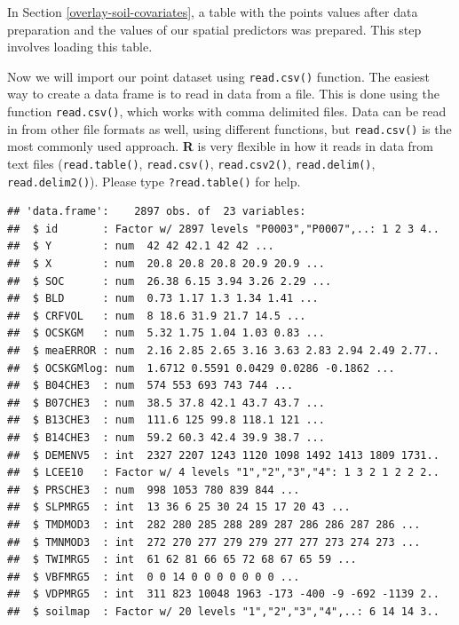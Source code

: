 \documentclass[10pt,b5paper,]{book}
\newenvironment{Shaded}{\begin{snugshade}}{\end{snugshade}}
\newcommand{\CommentTok}[1]{\textcolor[rgb]{0.56,0.35,0.01}{\textit{#1}}}
\newcommand{\KeywordTok}[1]{\textcolor[rgb]{0.13,0.29,0.53}{\textbf{#1}}}
\newcommand{\NormalTok}[1]{#1}
\newcommand{\OperatorTok}[1]{\textcolor[rgb]{0.81,0.36,0.00}{\textbf{#1}}}
\newcommand{\StringTok}[1]{\textcolor[rgb]{0.31,0.60,0.02}{#1}}
\theoremstyle{definition}
\theoremstyle{definition}
\theoremstyle{definition}
\theoremstyle{remark}
\begin{document}
In Section \ref{overlay-soil-covariates}, a table with the points values
after data preparation and the values of our spatial predictors was
prepared. This step involves loading this table.

Now we will import our point dataset using \texttt{read.csv()} function.
The easiest way to create a data frame is to read in data from a file.
This is done using the function \texttt{read.csv()}, which works with
comma delimited files. Data can be read in from other file formats as
well, using different functions, but \texttt{read.csv()} is the most
commonly used approach. \textbf{R} is very flexible in how it reads in
data from text files (\texttt{read.table()}, \texttt{read.csv()},
\texttt{read.csv2()}, \texttt{read.delim()}, \texttt{read.delim2()}).
Please type \texttt{?read.table()} for help.

\begin{Shaded}
\end{Shaded}

\begin{verbatim}
## 'data.frame':    2897 obs. of  23 variables:
##  $ id       : Factor w/ 2897 levels "P0003","P0007",..: 1 2 3 4..
##  $ Y        : num  42 42 42.1 42 42 ...
##  $ X        : num  20.8 20.8 20.8 20.9 20.9 ...
##  $ SOC      : num  26.38 6.15 3.94 3.26 2.29 ...
##  $ BLD      : num  0.73 1.17 1.3 1.34 1.41 ...
##  $ CRFVOL   : num  8 18.6 31.9 21.7 14.5 ...
##  $ OCSKGM   : num  5.32 1.75 1.04 1.03 0.83 ...
##  $ meaERROR : num  2.16 2.85 2.65 3.16 3.63 2.83 2.94 2.49 2.77..
##  $ OCSKGMlog: num  1.6712 0.5591 0.0429 0.0286 -0.1862 ...
##  $ B04CHE3  : num  574 553 693 743 744 ...
##  $ B07CHE3  : num  38.5 37.8 42.1 43.7 43.7 ...
##  $ B13CHE3  : num  111.6 125 99.8 118.1 121 ...
##  $ B14CHE3  : num  59.2 60.3 42.4 39.9 38.7 ...
##  $ DEMENV5  : int  2327 2207 1243 1120 1098 1492 1413 1809 1731..
##  $ LCEE10   : Factor w/ 4 levels "1","2","3","4": 1 3 2 1 2 2 2..
##  $ PRSCHE3  : num  998 1053 780 839 844 ...
##  $ SLPMRG5  : int  13 36 6 25 30 24 15 17 20 43 ...
##  $ TMDMOD3  : int  282 280 285 288 289 287 286 286 287 286 ...
##  $ TMNMOD3  : int  272 270 277 279 279 277 277 273 274 273 ...
##  $ TWIMRG5  : int  61 62 81 66 65 72 68 67 65 59 ...
##  $ VBFMRG5  : int  0 0 14 0 0 0 0 0 0 0 ...
##  $ VDPMRG5  : int  311 823 10048 1963 -173 -400 -9 -692 -1139 2..
##  $ soilmap  : Factor w/ 20 levels "1","2","3","4",..: 6 14 14 3..
\end{verbatim}
\end{document}
